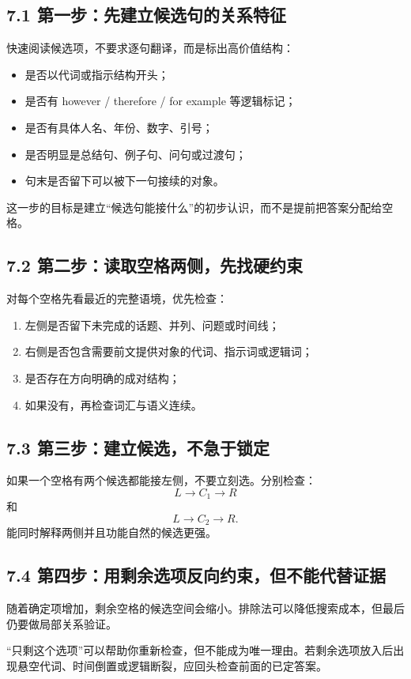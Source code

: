 \documentclass[11pt,a4paper]{ctexart}
\begin{document}
\subsection{7.1 第一步：先建立候选句的关系特征}
快速阅读候选项，不要求逐句翻译，而是标出高价值结构：
\begin{itemize}
  \item 是否以代词或指示结构开头；
  \item 是否有 however / therefore / for example 等逻辑标记；
  \item 是否有具体人名、年份、数字、引号；
  \item 是否明显是总结句、例子句、问句或过渡句；
  \item 句末是否留下可以被下一句接续的对象。
\end{itemize}
这一步的目标是建立“候选句能接什么”的初步认识，而不是提前把答案分配给空格。

\subsection{7.2 第二步：读取空格两侧，先找硬约束}
对每个空格先看最近的完整语境，优先检查：
\begin{enumerate}
  \item 左侧是否留下未完成的话题、并列、问题或时间线；
  \item 右侧是否包含需要前文提供对象的代词、指示词或逻辑词；
  \item 是否存在方向明确的成对结构；
  \item 如果没有，再检查词汇与语义连续。
\end{enumerate}

\subsection{7.3 第三步：建立候选，不急于锁定}
如果一个空格有两个候选都能接左侧，不要立刻选。分别检查：
\[
L\rightarrow C_1\rightarrow R
\]
和
\[
L\rightarrow C_2\rightarrow R.
\]
能同时解释两侧并且功能自然的候选更强。

\subsection{7.4 第四步：用剩余选项反向约束，但不能代替证据}
随着确定项增加，剩余空格的候选空间会缩小。排除法可以降低搜索成本，但最后仍要做局部关系验证。

\begin{warn}[排除法的边界]
“只剩这个选项”可以帮助你重新检查，但不能成为唯一理由。若剩余选项放入后出现悬空代词、时间倒置或逻辑断裂，应回头检查前面的已定答案。
\end{warn}
\end{document}
